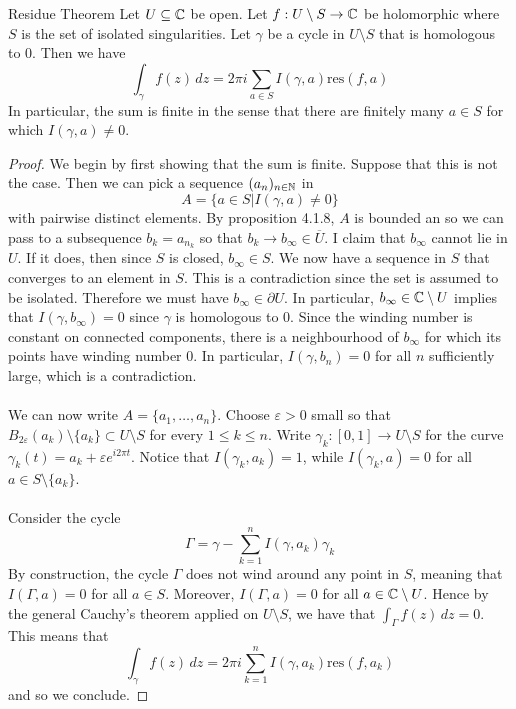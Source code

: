 \documentclass[a4paper]{article}
\begin{document}
\begin{thm}{Residue Theorem}{} Let $U\subseteq\mathbb{C}$ be open. Let $f:U\setminus S\to\mathbb{C}$ be holomorphic where $S$ is the set of isolated singularities. Let $\gamma$ be a cycle in $U\setminus S$ that is homologous to $0$. Then we have $$\int_\gamma f(z)\,dz=2\pi i\sum_{a\in S}I(\gamma,a)\text{res}(f,a)$$ In particular, the sum is finite in the sense that there are finitely many $a\in S$ for which $I(\gamma,a)\neq 0$. \tcbline
\begin{proof} 
We begin by first showing that the sum is finite. Suppose that this is not the case. Then we can pick a sequence $(a_n)_{n\in\mathbb{N}}$ in $$A=\{a\in S|I(\gamma,a)\neq 0\}$$ with pairwise distinct elements. By proposition 4.1.8, $A$ is bounded an so we can pass to a subsequence $b_k=a_{n_k}$ so that $b_k\to b_\infty\in\overline{U}$. I claim that $b_\infty$ cannot lie in $U$. If it does, then since $S$ is closed, $b_\infty\in S$. We now have a sequence in $S$ that converges to an element in $S$. This is a contradiction since the set is assumed to be isolated. Therefore we must have $b_\infty\in\partial U$. In particular, $b_\infty\in\mathbb{C}\setminus U$ implies that $I(\gamma, b_\infty)=0$ since $\gamma$ is homologous to $0$. Since the winding number is constant on connected components, there is a neighbourhood of $b_\infty$ for which its points have winding number $0$. In particular, $I(\gamma, b_n)=0$ for all $n$ sufficiently large, which is a contradiction. \\~\\

We can now write $A=\{a_1,\dots,a_n\}$. Choose $\varepsilon>0$ small so that $B_{2\varepsilon}(a_k)\setminus\{a_k\}\subset U\setminus S$ for every $1\leq k\leq n$. Write $\gamma_k:[0,1]\to U\setminus S$ for the curve $\gamma_k(t)=a_k+\varepsilon e^{i2\pi t}$. Notice that $I(\gamma_k,a_k)=1$, while $I(\gamma_k,a)=0$ for all $a\in S\setminus\{a_k\}$. \\~\\

Consider the cycle $$\Gamma=\gamma-\sum_{k=1}^nI(\gamma,a_k)\gamma_k$$ By construction, the cycle $\Gamma$ does not wind around any point in $S$, meaning that $I(\Gamma,a)=0$ for all $a\in S$. Moreover, $I(\Gamma,a)=0$ for all $a\in\mathbb{C}\setminus U$. Hence by the general Cauchy's theorem applied on $U\setminus S$, we have that $\int_\Gamma f(z)\,dz=0$. This means that $$\int_\gamma f(z)\,dz=2\pi i\sum_{k=1}^nI(\gamma,a_k)\text{res}(f,a_k)$$ and so we conclude. 
\end{proof}
\end{thm}
\end{document}
